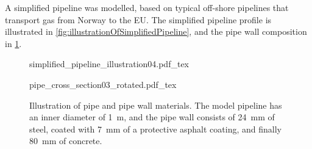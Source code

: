 A simplified pipeline was modelled, based on typical off-shore pipelines that transport gas from Norway to the EU. The simplified pipeline profile is illustrated in \cref{fig:illustrationOfSimplifiedPipeline}, and the pipe wall composition in \cref{fig:pipeCrossSection}.



\begin{figure}[!ht]%
\centering%
\begin{minipage}{9.6cm}%
    {simplified_pipeline_illustration04.pdf_tex}%
    \\ %
    \parbox{0.9\textwidth}{%
        \vspace{2mm}%
        \caption{%
            Illustration of the simplified pipeline. The pipe is on-shore and buried 2~m underground for the first and last 25~km, and 100~m below sea level and exposed to sea water for 600~km between the on-shore sections. Figure created freely after figure in \cite{Helgaker2013Modeling}.%
            \label{fig:illustrationOfSimplifiedPipeline}%
        }%
    }%
\end{minipage}%
\hspace{0.099cm}%
\begin{minipage}{6.3cm}%
    {pipe_cross_section03_rotated.pdf_tex}%
    \caption{%
        Illustration of pipe and pipe wall materials. The model pipeline has an inner diameter of \SI{1}{\meter}, and the pipe wall consists of \SI{24}{mm} of steel, coated with \SI{7}{mm} of a protective asphalt coating, and finally \SI{80}{mm} of concrete.%
        \label{fig:pipeCrossSection}%
    }%
\end{minipage}%
\end{figure}

